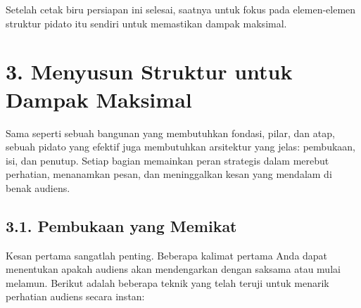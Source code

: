 \documentclass[
  letterpaper,
  DIV=11,
  numbers=noendperiod]{scrreprt}
\begin{document}
Setelah cetak biru persiapan ini selesai, saatnya untuk fokus pada
elemen-elemen struktur pidato itu sendiri untuk memastikan dampak
maksimal.


\chapter{3. Menyusun Struktur untuk Dampak
Maksimal}\label{menyusun-struktur-untuk-dampak-maksimal}

Sama seperti sebuah bangunan yang membutuhkan fondasi, pilar, dan atap,
sebuah pidato yang efektif juga membutuhkan arsitektur yang jelas:
pembukaan, isi, dan penutup. Setiap bagian memainkan peran strategis
dalam merebut perhatian, menanamkan pesan, dan meninggalkan kesan yang
mendalam di benak audiens.

\section{\texorpdfstring{\textbf{3.1. Pembukaan yang
Memikat}}{3.1. Pembukaan yang Memikat}}\label{pembukaan-yang-memikat}

Kesan pertama sangatlah penting. Beberapa kalimat pertama Anda dapat
menentukan apakah audiens akan mendengarkan dengan saksama atau mulai
melamun. Berikut adalah beberapa teknik yang telah teruji untuk menarik
perhatian audiens secara instan:
\end{document}
